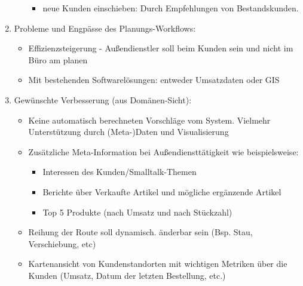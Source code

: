 \documentclass[Bachelorarbeit.tex]{subfiles}
\begin{document}
\begin{enumerate}
\begin{enumerate}
\begin{itemize}
			\item neue Kunden einschieben: Durch Empfehlungen von Bestandskunden. 
		\end{itemize}
	\end{enumerate}
	\item Probleme und Engpässe des Planungs-Workflows:
	\begin{itemize}
		\item Effizienzsteigerung - Außendienstler soll beim Kunden sein und nicht im Büro am planen
		\item Mit bestehenden Softwarelösungen: entweder Umsatzdaten oder \ac{GIS} 
	\end{itemize}
	\item Gewünschte Verbesserung (aus Domänen-Sicht):
	\begin{itemize}
		\item Keine automatisch berechneten Vorschläge vom System. Vielmehr Unterstützung durch (Meta-)Daten und Visualisierung
		\item Zusätzliche Meta-Information bei Außendiensttätigkeit wie beispielsweise:
		\begin{itemize}
			\item Interessen des Kunden/Smalltalk-Themen
			\item Berichte über Verkaufte Artikel und mögliche ergänzende Artikel
			\item Top 5 Produkte (nach Umsatz und nach Stückzahl)
		\end{itemize}
		\item Reihung der Route soll dynamisch. änderbar sein (Bsp. Stau, Verschiebung, etc)
		\item Kartenansicht von Kundenstandorten mit wichtigen Metriken über die Kunden (Umsatz, Datum der letzten Bestellung, etc.)
	\end{itemize}
\end{enumerate}
\newpage
\end{document}
